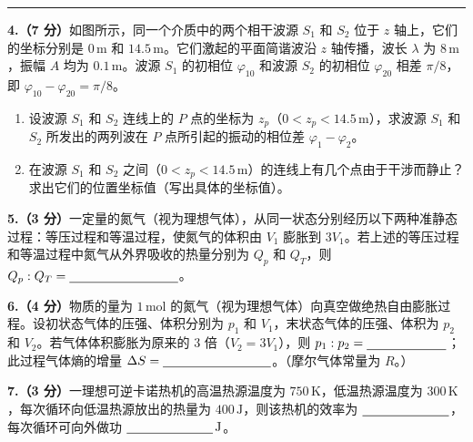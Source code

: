 \documentclass[12pt,a4paper,UTF8]{ctexart}
\newcommand{\qitem}[1]{\par\needspace{5\baselineskip}\smallskip\noindent\textbf{#1}\hspace{0.5em}}
\newcommand{\fillblank}[1][2.6cm]{\rule[-0.48ex]{#1}{0.45pt}}
\newenvironment{compactfigure}{\par\vspace{0.15em}\begingroup\centering}{\par\endgroup\vspace{0.10em}}
\newcommand{\sourcepage}[1]{\par\medskip\noindent{\small\bfseries 原稿第 #1 页}\par\vspace{-0.2em}\hrule\smallskip}
\begin{document}
\sourcepage{2}
\qitem{4.（7 分）}如图所示，同一个介质中的两个相干波源 $S_1$ 和 $S_2$ 位于 $z$ 轴上，它们的坐标分别是 $0\,\mathrm m$ 和 $14.5\,\mathrm m$。它们激起的平面简谐波沿 $z$ 轴传播，波长 $\lambda$ 为 $8\,\mathrm m$，振幅 $A$ 均为 $0.1\,\mathrm m$。波源 $S_1$ 的初相位 $\varphi_{10}$ 和波源 $S_2$ 的初相位 $\varphi_{20}$ 相差 $\pi/8$，即 $\varphi_{10}-\varphi_{20}=\pi/8$。
\begin{compactfigure}
\end{compactfigure}
\begin{enumerate}[label=\arabic*)]
\item 设波源 $S_1$ 和 $S_2$ 连线上的 $P$ 点的坐标为 $z_p$（$0<z_p<14.5\,\mathrm m$），求波源 $S_1$ 和 $S_2$ 所发出的两列波在 $P$ 点所引起的振动的相位差 $\varphi_1-\varphi_2$。
\item 在波源 $S_1$ 和 $S_2$ 之间（$0<z_p<14.5\,\mathrm m$）的连线上有几个点由于干涉而静止？求出它们的位置坐标值（写出具体的坐标值）。
\end{enumerate}

\qitem{5.（3 分）}一定量的氮气（视为理想气体），从同一状态分别经历以下两种准静态过程：等压过程和等温过程，使氮气的体积由 $V_1$ 膨胀到 $3V_1$。若上述的等压过程和等温过程中氮气从外界吸收的热量分别为 $Q_p$ 和 $Q_T$，则 $Q_p:Q_T=\fillblank[3cm]$。

\qitem{6.（4 分）}物质的量为 $1\,\mathrm{mol}$ 的氮气（视为理想气体）向真空做绝热自由膨胀过程。设初状态气体的压强、体积分别为 $p_1$ 和 $V_1$，末状态气体的压强、体积为 $p_2$ 和 $V_2$。若气体体积膨胀为原来的 $3$ 倍（$V_2=3V_1$），则 $p_1:p_2=\fillblank[2.2cm]$；此过程气体熵的增量 $\Delta S=\fillblank[3cm]$。（摩尔气体常量为 $R$。）

\qitem{7.（3 分）}一理想可逆卡诺热机的高温热源温度为 $750\,\mathrm K$，低温热源温度为 $300\,\mathrm K$，每次循环向低温热源放出的热量为 $400\,\mathrm J$，则该热机的效率为 $\fillblank[2.4cm]$，每次循环可向外做功 $\fillblank[2.4cm]\,\mathrm J$。
\end{document}
